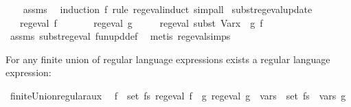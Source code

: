 \begin{isabellebody}
%
\isadelimproof
\ \ %
\endisadelimproof
%
\isatagproof
{}\isamarkupfalse%
\ assms\ \isamarkupfalse%
\ {\isacharparenleft}{\kern0pt}induction\ f\ rule{\isacharcolon}{\kern0pt}\ reg{\isacharunderscore}{\kern0pt}eval{\isachardot}{\kern0pt}induct{\isacharparenright}{\kern0pt}\ simp{\isacharunderscore}{\kern0pt}all%
\endisatagproof
{\isafoldproof}%
%
\isadelimproof
\isanewline
%
\endisadelimproof
\isanewline
{}\isamarkupfalse%
\ subst{\isacharunderscore}{\kern0pt}reg{\isacharunderscore}{\kern0pt}eval{\isacharunderscore}{\kern0pt}update{\isacharcolon}{\kern0pt}\isanewline
\ \ \ {\isachardoublequoteopen}reg{\isacharunderscore}{\kern0pt}eval\ f{\isachardoublequoteclose}\isanewline
\ \ \ \ \ \ \ {\isachardoublequoteopen}reg{\isacharunderscore}{\kern0pt}eval\ g{\isachardoublequoteclose}\isanewline
\ \ \ \ \ {\isachardoublequoteopen}reg{\isacharunderscore}{\kern0pt}eval\ {\isacharparenleft}{\kern0pt}subst\ {\isacharparenleft}{\kern0pt}Var{\isacharparenleft}{\kern0pt}x\ {\isacharcolon}{\kern0pt}{\isacharequal}{\kern0pt}\ g{\isacharparenright}{\kern0pt}{\isacharparenright}{\kern0pt}\ f{\isacharparenright}{\kern0pt}{\isachardoublequoteclose}\isanewline
%
\isadelimproof
\ \ %
\endisadelimproof
%
\isatagproof
{}\isamarkupfalse%
\ assms\ subst{\isacharunderscore}{\kern0pt}reg{\isacharunderscore}{\kern0pt}eval\ fun{\isacharunderscore}{\kern0pt}upd{\isacharunderscore}{\kern0pt}def\ \isamarkupfalse%
\ {\isacharparenleft}{\kern0pt}metis\ reg{\isacharunderscore}{\kern0pt}eval{\isachardot}{\kern0pt}simps{\isacharparenleft}{\kern0pt}{}{\isacharparenright}{\kern0pt}{\isacharparenright}{\kern0pt}%
\endisatagproof
{\isafoldproof}%
%
\isadelimproof
%
\endisadelimproof
%
\begin{isamarkuptext}%
For any finite union of  regular language expressions exists a  regular
language expression:%
\end{isamarkuptext}\isamarkuptrue%
\isamarkupfalse%
\ finite{\isacharunderscore}{\kern0pt}Union{\isacharunderscore}{\kern0pt}regular{\isacharunderscore}{\kern0pt}aux{\isacharcolon}{\kern0pt}\isanewline
\ \ {\isachardoublequoteopen}{\isasymforall}f\ {\isasymin}\ set\ fs{\isachardot}{\kern0pt}\ reg{\isacharunderscore}{\kern0pt}eval\ f\ {\isasymLongrightarrow}\ {\isasymexists}g{\isachardot}{\kern0pt}\ reg{\isacharunderscore}{\kern0pt}eval\ g\ {\isasymand}\ {\isasymUnion}{\isacharparenleft}{\kern0pt}vars\ {\isacharbackquote}{\kern0pt}\ set\ fs{\isacharparenright}{\kern0pt}\ {\isacharequal}{\kern0pt}\ vars\ g\isanewline

\end{isabellebody}
